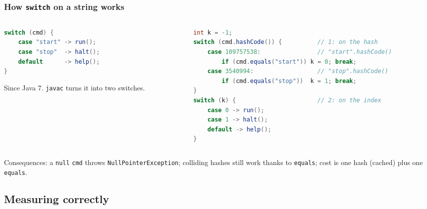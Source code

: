 \documentclass[aspectratio=169,10pt,compress]{beamer}
\begin{document}
\begin{frame}[t,fragile] \frametitle{How \texttt{switch} on a string works}
  \begin{columns}[T]
    \begin{column}{0.4\textwidth}


\begin{lstlisting}[style=codesnippet, language=Java]
switch (cmd) {
    case "start" -> run();
    case "stop"  -> halt();
    default      -> help();
}
\end{lstlisting}



      \small Since Java 7. \texttt{javac} turns it into two switches.
    \end{column}
    \begin{column}{0.56\textwidth}


\begin{lstlisting}[style=codesnippet, language=Java, basicstyle=\ttfamily\scriptsize]
int k = -1;
switch (cmd.hashCode()) {          // 1: on the hash
    case 109757538:                // "start".hashCode()
        if (cmd.equals("start")) k = 0; break;
    case 3540994:                  // "stop".hashCode()
        if (cmd.equals("stop"))  k = 1; break;
}
switch (k) {                       // 2: on the index
    case 0 -> run();
    case 1 -> halt();
    default -> help();
}
\end{lstlisting}



    \end{column}
  \end{columns}
  \small Consequences: a \texttt{null} \texttt{cmd} throws \texttt{NullPointerException}; colliding hashes still work thanks to \texttt{equals};
  cost is one hash (cached) plus one \texttt{equals}.
\end{frame}


\subsection[Benchmark]{Measuring correctly}
\end{document}

